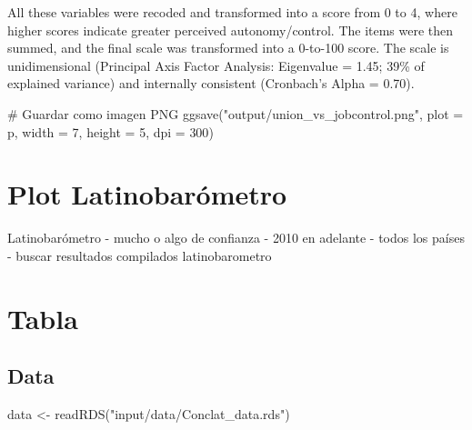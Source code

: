 \documentclass[
  letterpaper,
  DIV=11,
  numbers=noendperiod]{scrreprt}
\newenvironment{Shaded}{\begin{snugshade}}{\end{snugshade}}
\newcommand{\AttributeTok}[1]{\textcolor[rgb]{0.40,0.45,0.13}{#1}}
\newcommand{\CommentTok}[1]{\textcolor[rgb]{0.37,0.37,0.37}{#1}}
\newcommand{\DecValTok}[1]{\textcolor[rgb]{0.68,0.00,0.00}{#1}}
\newcommand{\FunctionTok}[1]{\textcolor[rgb]{0.28,0.35,0.67}{#1}}
\newcommand{\NormalTok}[1]{\textcolor[rgb]{0.00,0.23,0.31}{#1}}
\newcommand{\OtherTok}[1]{\textcolor[rgb]{0.00,0.23,0.31}{#1}}
\newcommand{\StringTok}[1]{\textcolor[rgb]{0.13,0.47,0.30}{#1}}
\begin{document}
All these variables were recoded and transformed into a score from 0 to
4, where higher scores indicate greater perceived autonomy/control. The
items were then summed, and the final scale was transformed into a
0-to-100 score. The scale is unidimensional (Principal Axis Factor
Analysis: Eigenvalue = 1.45; 39\% of explained variance) and internally
consistent (Cronbach's Alpha = 0.70).

\begin{Shaded}
\begin{Highlighting}[]
\CommentTok{\# Guardar como imagen PNG}
\FunctionTok{ggsave}\NormalTok{(}\StringTok{"output/union\_vs\_jobcontrol.png"}\NormalTok{, }\AttributeTok{plot =}\NormalTok{ p, }\AttributeTok{width =} \DecValTok{7}\NormalTok{, }\AttributeTok{height =} \DecValTok{5}\NormalTok{, }\AttributeTok{dpi =} \DecValTok{300}\NormalTok{)}
\end{Highlighting}
\end{Shaded}

\hypertarget{plot-latinobaruxf3metro}{%
\section{Plot Latinobarómetro}\label{plot-latinobaruxf3metro}}

Latinobarómetro - mucho o algo de confianza - 2010 en adelante - todos
los países - buscar resultados compilados latinobarometro

\hypertarget{tabla}{%
\section{Tabla}\label{tabla}}

\hypertarget{data}{%
\subsection{Data}\label{data}}

\begin{Shaded}
\begin{Highlighting}[]
\NormalTok{data }\OtherTok{\textless{}{-}} \FunctionTok{readRDS}\NormalTok{(}\StringTok{"input/data/Conclat\_data.rds"}\NormalTok{)}
\end{Highlighting}
\end{Shaded}
\end{document}
